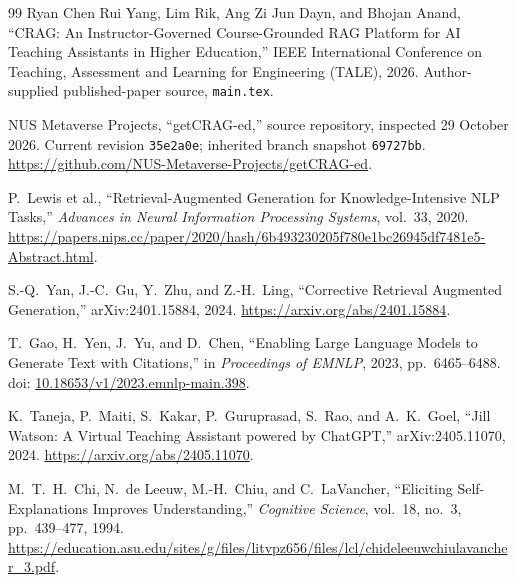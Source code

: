 \documentclass[11pt,a4paper]{article}
\begin{document}
\clearpage
\begin{thebibliography}{99}
\small
{}
Ryan Chen Rui Yang, Lim Rik, Ang Zi Jun Dayn, and Bhojan Anand,
``CRAG: An Instructor-Governed Course-Grounded RAG Platform for AI Teaching Assistants in Higher Education,''
IEEE International Conference on Teaching, Assessment and Learning for Engineering (TALE), 2026.
Author-supplied published-paper source, \texttt{main.tex}.

NUS Metaverse Projects, ``getCRAG-ed,'' source repository, inspected 29 October 2026.
Current revision \texttt{35e2a0e}; inherited branch snapshot \texttt{69727bb}.
\url{https://github.com/NUS-Metaverse-Projects/getCRAG-ed}.

P.~Lewis et al., ``Retrieval-Augmented Generation for Knowledge-Intensive NLP Tasks,''
\emph{Advances in Neural Information Processing Systems}, vol.~33, 2020.
\url{https://papers.nips.cc/paper/2020/hash/6b493230205f780e1bc26945df7481e5-Abstract.html}.

S.-Q.~Yan, J.-C.~Gu, Y.~Zhu, and Z.-H.~Ling,
``Corrective Retrieval Augmented Generation,'' arXiv:2401.15884, 2024.
\url{https://arxiv.org/abs/2401.15884}.

T.~Gao, H.~Yen, J.~Yu, and D.~Chen,
``Enabling Large Language Models to Generate Text with Citations,''
in \emph{Proceedings of EMNLP}, 2023, pp.~6465--6488.
doi: \href{https://doi.org/10.18653/v1/2023.emnlp-main.398}{10.18653/v1/2023.emnlp-main.398}.

K.~Taneja, P.~Maiti, S.~Kakar, P.~Guruprasad, S.~Rao, and A.~K.~Goel,
``Jill Watson: A Virtual Teaching Assistant powered by ChatGPT,''
arXiv:2405.11070, 2024.
\url{https://arxiv.org/abs/2405.11070}.

M.~T.~H.~Chi, N.~de Leeuw, M.-H.~Chiu, and C.~LaVancher,
``Eliciting Self-Explanations Improves Understanding,''
\emph{Cognitive Science}, vol.~18, no.~3, pp.~439--477, 1994.
\url{https://education.asu.edu/sites/g/files/litvpz656/files/lcl/chideleeuwchiulavancher_3.pdf}.


\end{thebibliography}
\end{document}
